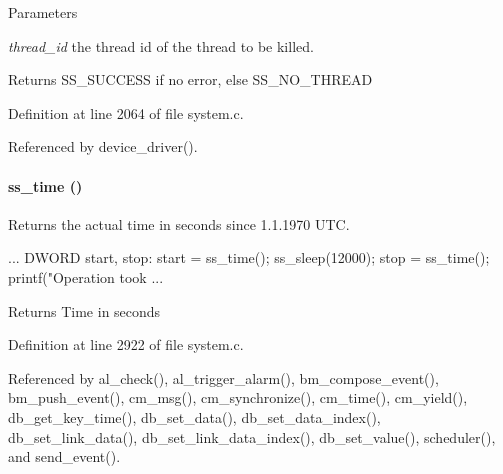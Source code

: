\begin{DoxyParams}{Parameters}
\item[{\em thread\_\-id}]the thread id of the thread to be killed. \end{DoxyParams}
\begin{DoxyReturn}{Returns}
SS\_\-SUCCESS if no error, else SS\_\-NO\_\-THREAD 
\end{DoxyReturn}


Definition at line 2064 of file system.c.

Referenced by device\_\-driver().
\paragraph[{ss\_\-time}]{ ss\_\-time ()}\hfill\label{group__msfunctionc_gab7852119bd4dc1e08aa03127d8ca008b}
Returns the actual time in seconds since 1.1.1970 UTC. 
\begin{DoxyCode}
...
DWORD start, stop:
start = ss_time();
  ss_sleep(12000);
stop = ss_time();
printf("Operation took %
...
\end{DoxyCode}
 \begin{DoxyReturn}{Returns}
Time in seconds 
\end{DoxyReturn}


Definition at line 2922 of file system.c.

Referenced by al\_\-check(), al\_\-trigger\_\-alarm(), bm\_\-compose\_\-event(), bm\_\-push\_\-event(), cm\_\-msg(), cm\_\-synchronize(), cm\_\-time(), cm\_\-yield(), db\_\-get\_\-key\_\-time(), db\_\-set\_\-data(), db\_\-set\_\-data\_\-index(), db\_\-set\_\-link\_\-data(), db\_\-set\_\-link\_\-data\_\-index(), db\_\-set\_\-value(), scheduler(), and send\_\-event().